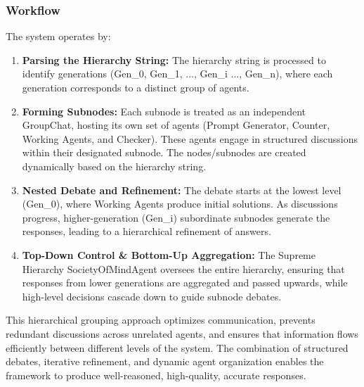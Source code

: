 \subsubsection{Workflow}

The system operates by:
\begin{enumerate}
\item \textbf{Parsing the Hierarchy String:} The hierarchy string is processed to identify generations (Gen\_0, Gen\_1, ..., Gen\_i ..., Gen\_n), where each generation corresponds to a distinct group of agents.
\item \textbf{Forming Subnodes:} Each subnode is treated as an independent GroupChat, hosting its own set of agents (Prompt Generator, Counter, Working Agents, and Checker). These agents engage in structured discussions within their designated subnode. The nodes/subnodes are created dynamically based on the hierarchy string.
\item \textbf{Nested Debate and Refinement:} The debate starts at the lowest level (Gen\_0), where Working Agents produce initial solutions. As discussions progress, higher-generation (Gen\_i) subordinate subnodes generate the responses, leading to a hierarchical refinement of answers.
\item \textbf{Top-Down Control \& Bottom-Up Aggregation:} The Supreme Hierarchy SocietyOfMindAgent oversees the entire hierarchy, ensuring that responses from lower generations are aggregated and passed upwards, while high-level decisions cascade down to guide subnode debates.
\end{enumerate}

This hierarchical grouping approach optimizes communication, prevents redundant discussions across unrelated agents, and ensures that information flows efficiently between different levels of the system. The combination of structured debates, iterative refinement, and dynamic agent organization enables the framework to produce well-reasoned, high-quality, accurate responses.
